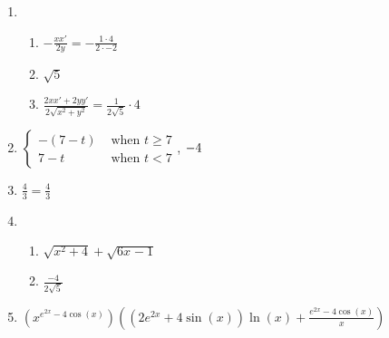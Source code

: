 \documentclass[12pt,twoside]{article}
\makeatletter
\def\emptycleardoublepage{\clearpage\if@twoside \ifodd\c@page\else
\thispagestyle{empty}%
\hbox{}\newpage\if@twocolumn\hbox{}\newpage\fi\fi\fi}
\makeatother
\begin{document}
\begin{multicols}{2}
\begin{enumerate}
\def \b{2}\def \x{1}\def \y{-2}\def \xchange{4}\def \ratrhs{-2}\def \cirrhs{9}\def \hyprhs{-7}\def \compy{2y^{2}}\def \ychangenum{-8}\def \dist{5}\def \fracrat{-24}\def \fraccirc{4}\def \frachyp{12}
\item \begin{enumerate}
\item $-\frac{xx'}{\b y} = -\frac{\x \cdot \xchange}{\b \cdot \y}$
\item $\sqrt{\dist}$
\item $\frac{2xx'+2yy'}{2\sqrt{x^2+y^2}} = \frac{1}{2\sqrt{\dist}} \cdot \fraccirc$
\end{enumerate}
\def \a{7}\def \k{4}\def \abstop{1}\def \ktop{1}
\item $\begin{cases} -(\a -t) & \text{ when } t \geq \a \\ \a-t & \text{ when } t < \a \end{cases}$, $\ifthenelse{\ktop=1}{-\k}{-\frac{1}{\k}}$
\def \a{1}\def \b{-3}\def \k{3}\def \fancyp{x^{2}+2x^{}-3}\def \simplep{3x^{}-3}\def \fancyreduced{4}\def \niceanstop{\frac{4}{3}}\def \niceansbottom{\frac{3}{4}}
\item $\frac{\fancyreduced}{\k} = \niceanstop$
\def \a{1}\def \b{5}\def \ab{5}\def \c{4}\def \amb{-4}\def \ansroot{5}\def \firstroot{x^{2}+4}\def \secondroot{6x^{}-1}\def \porm{1}
\item \begin{enumerate}
\item $\sqrt{\firstroot} + \sqrt{\secondroot}$
\item $\frac{\amb}{2\sqrt{\ansroot}}$
\end{enumerate}
\def \varexp{2}\def \newexp{1}\def \trigcoeff{-4}\def \trigval{-4}\def \oppval{+4}
\item $(x^{e^{\varexp x} \trigval \cos(x)}) \left( (\varexp e^{\varexp x} \oppval \sin(x))\ln(x) + \frac{e^{\varexp x} \trigval \cos(x)}{x} \right)$
 \end{enumerate}\end{multicols}\emptycleardoublepage{}\graphicspath{{C:/Users/iainc/anaconda3/Randomizer/MATH 1001/Midterm 1/}}\begin{multicols}{2} \begin{enumerate}\def \a{-6}\def \b{3}\def \c{-3}\def \d{1}\def \negb{-3}\def \negc{3}\def \determ{3}\def \ansa{\frac{1}{3}}\def \ansb{-1}\def \ansc{1}\def \ansd{-2}

\end{enumerate}
\end{multicols}
\end{document}
